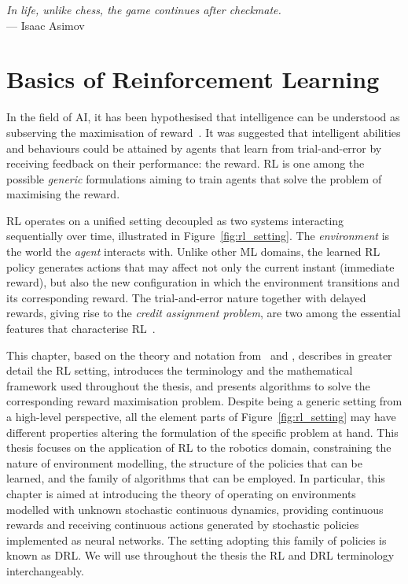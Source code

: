 \begin{addmargin}{0cm}

\begin{flushright}
    \textsl{In life, unlike chess, the game continues after checkmate.}\\
    --- Isaac Asimov
\end{flushright}

\chapter{Basics of Reinforcement Learning}
\label{ch:reinforcement_learning}
\vspace*{-4mm}

In the field of \ac{AI}, it has been hypothesised that intelligence can be understood as subserving the maximisation of reward~\parencite{silver_reward_2021}.
It was suggested that intelligent abilities and behaviours could be attained by agents that learn from trial-and-error by receiving feedback on their performance: the reward.
\ac{RL} is one among the possible \emph{generic} formulations aiming to train agents that solve the problem of maximising the reward.

\acl{RL} operates on a unified setting decoupled as two systems interacting sequentially over time, illustrated in Figure~\ref{fig:rl_setting}.
The \emph{environment} is the world the \emph{agent} interacts with.
Unlike other \ac{ML} domains, the learned \ac{RL} policy generates actions that may affect not only the current instant (immediate reward), but also the new configuration in which the environment transitions and its corresponding reward.
The trial-and-error nature together with delayed rewards, giving rise to the \emph{credit assignment problem}, are two among the essential features that characterise \acs{RL}~\parencite{sutton_reinforcement_2018}.

This chapter, based on the theory and notation from~\textcite{achiam_spinning_2018} and \textcite{dong_deep_2020}, describes in greater detail the \acl{RL} setting, introduces the terminology and the mathematical framework used throughout the thesis, and presents algorithms to solve the corresponding reward maximisation problem.
Despite being a generic setting from a high-level perspective, all the element parts of Figure~\ref{fig:rl_setting} may have different properties altering the formulation of the specific problem at hand.
This thesis focuses on the application of \ac{RL} to the robotics domain, constraining the nature of environment modelling, the structure of the policies that can be learned, and the family of algorithms that can be employed.
In particular, this chapter is aimed at introducing the theory of operating on environments modelled with unknown stochastic continuous dynamics, providing continuous rewards and receiving continuous actions generated by stochastic policies implemented as neural networks.
The setting adopting this family of policies is known as \ac{DRL}.
We will use throughout the thesis the \ac{RL} and \ac{DRL} terminology interchangeably.

\end{addmargin}

